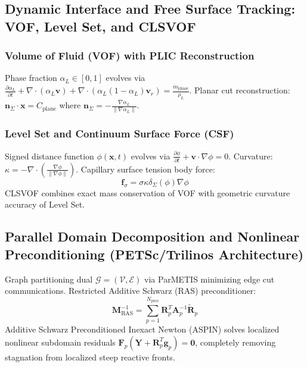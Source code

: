 \documentclass[11pt,a4paper]{article}
\begin{document}
\subsection{Dynamic Interface and Free Surface Tracking: VOF, Level Set, and CLSVOF}

\subsubsection{Volume of Fluid (VOF) with PLIC Reconstruction}
Phase fraction $\alpha_L \in [0, 1]$ evolves via $\frac{\partial \alpha_L}{\partial t} + \nabla \cdot (\alpha_L \mathbf{v}) + \nabla \cdot (\alpha_L(1 - \alpha_L)\mathbf{v}_r) = \frac{\dot{m}_{\text{phase}}}{\rho_L}$.
Planar cut reconstruction: $\mathbf{n}_{\Sigma} \cdot \mathbf{x} = C_{\text{plane}}$ where $\mathbf{n}_{\Sigma} = -\frac{\nabla \alpha_L}{\|\nabla \alpha_L\|}$.

\subsubsection{Level Set and Continuum Surface Force (CSF)}
Signed distance function $\phi(\mathbf{x}, t)$ evolves via $\frac{\partial \phi}{\partial t} + \mathbf{v} \cdot \nabla \phi = 0$.
Curvature: $\kappa = -\nabla \cdot \left( \frac{\nabla \phi}{\|\nabla \phi\|} \right)$.
Capillary surface tension body force:
\begin{equation}
\mathbf{f}_\sigma = \sigma \kappa \delta_\Sigma(\phi) \nabla \phi
\end{equation}
CLSVOF combines exact mass conservation of VOF with geometric curvature accuracy of Level Set.

\subsection{Parallel Domain Decomposition and Nonlinear Preconditioning (PETSc/Trilinos Architecture)}

Graph partitioning dual $\mathcal{G} = (\mathcal{V}, \mathcal{E})$ via ParMETIS minimizing edge cut communications.
Restricted Additive Schwarz (RAS) preconditioner:
\begin{equation}
\mathbf{M}_{\text{RAS}}^{-1} = \sum_{p=1}^{N_{\text{proc}}} \mathbf{R}_p^T \mathbf{A}_p^{-1} \widetilde{\mathbf{R}}_p
\end{equation}
Additive Schwarz Preconditioned Inexact Newton (ASPIN) solves localized nonlinear subdomain residuals $\mathbf{F}_p(\mathbf{Y} + \mathbf{R}_p^T \mathbf{g}_p) = \mathbf{0}$, completely removing stagnation from localized steep reactive fronts.
\end{document}
